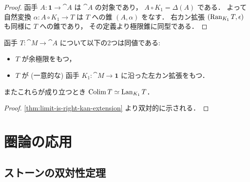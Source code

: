 \documentclass[titlepage]{ltjsreport}
\begin{document}
\begin{proof}
  函手 $A:\mathbf{1}\to\cat{A}$ は $\cat{A}$ の対象であり，
  $A\circ K_1=\Delta(A)$ である．
  よって自然変換 $\alpha:A\circ K_1\to T$ は $T$ への錐 $(A,\alpha)$ をなす．
  右カン拡張 $(\operatorname{Ran}_{K_1}T,\epsilon)$ も同様に $T$ への錐であり，
  その定義より極限錐に同型である．
\end{proof}

\begin{center}
  \begin{minipage}[b]{0.4\linewidth}
    
  \end{minipage}
  \begin{minipage}[b]{0.4\linewidth}
    
  \end{minipage}
\end{center}

\begin{theorem}[余極限は左カン拡張である]
  函手 $T:\cat{M}\to\cat{A}$ について以下の2つは同値である:
  \begin{itemize}
    \item $T$ が余極限をもつ，
    \item $T$ が (一意的な) 函手 $K_1:\cat{M}\to\mathbf{1}$
          に沿った左カン拡張をもつ．
  \end{itemize}
  またこれらが成り立つとき $\operatorname{Colim} T\simeq\operatorname{Lan}_{K_1}T$．
\end{theorem}

\begin{proof}
  \cref{thm:limit-is-right-kan-extension} より双対的に示される．
\end{proof}

\begin{center}
  \begin{minipage}[b]{0.4\linewidth}
    
  \end{minipage}
  \begin{minipage}[b]{0.4\linewidth}
    
  \end{minipage}
\end{center}

\chapter{圏論の応用}

\section{ストーンの双対性定理}
\end{document}
